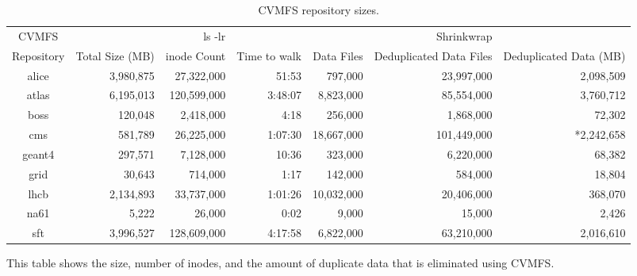 \documentclass[sigconf]{acmart}
\begin{document}
\begin{table}[t]
\begin{center}
\begin{tabular}{|c|r r r|r r r|}
\hline
CVMFS & & ls -lr & & & Shrinkwrap & \\
Repository & Total Size (MB) & inode Count & Time to walk & 
  Data Files & Deduplicated Data Files & Deduplicated Data (MB) \\ \hline
alice & 3,980,875 & 27,322,000 & 51:53 & 
  797,000 & 23,997,000 & 2,098,509\\
atlas & 6,195,013 & 120,599,000 & 3:48:07 &
 8,823,000 & 85,554,000 & 3,760,712 \\
boss & 120,048 & 2,418,000 & 4:18 &
 256,000 & 1,868,000 & 72,302\\
cms & 581,789 & 26,225,000 & 1:07:30 &
 18,667,000 & 101,449,000 & *2,242,658\\
geant4 & 297,571 & 7,128,000 & 10:36 &
 323,000 & 6,220,000 & 68,382 \\
grid & 30,643 & 714,000 & 1:17 &
 142,000 & 584,000 & 18,804 \\
lhcb & 2,134,893 & 33,737,000 & 1:01:26 &
 10,032,000 & 20,406,000 & 368,070 \\
na61 & 5,222 & 26,000 & 0:02 &
 9,000 & 15,000 & 2,426 \\
sft & 3,996,527 & 128,609,000 & 4:17:58 &
 6,822,000 & 63,210,000 & 2,016,610 \\ 
 \hline
\end{tabular}
\caption{CVMFS repository sizes.}
\label{tab:repo-sizes}
This table shows the size, number of inodes, and the amount
of duplicate data that is eliminated using CVMFS.
\end{center}
\end{table}
\end{document}
